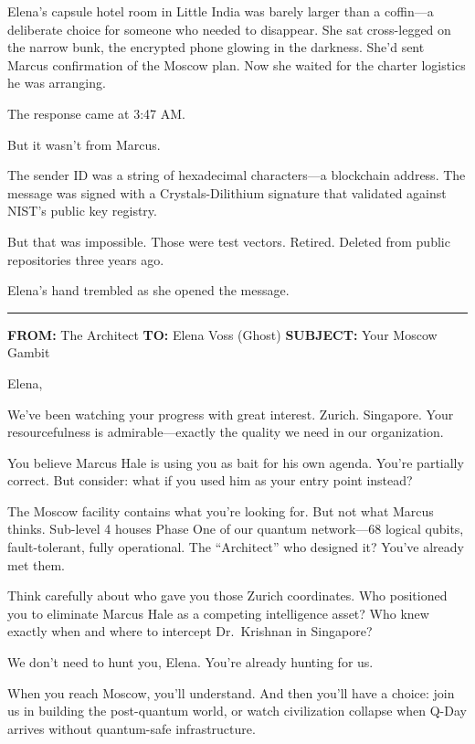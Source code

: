 Elena's capsule hotel room in Little India was barely larger than a
coffin---a deliberate choice for someone who needed to disappear. She
sat cross-legged on the narrow bunk, the encrypted phone glowing in the
darkness. She'd sent Marcus confirmation of the Moscow plan. Now she
waited for the charter logistics he was arranging.

The response came at 3:47 AM.

But it wasn't from Marcus.

The sender ID was a string of hexadecimal characters---a blockchain
address. The message was signed with a Crystals-Dilithium signature that
validated against NIST's public key registry.

But that was impossible. Those were test vectors. Retired. Deleted from
public repositories three years ago.

Elena's hand trembled as she opened the message.

\begin{center}\rule{0.5\linewidth}{0.5pt}\end{center}

\textbf{FROM:} The Architect \textbf{TO:} Elena Voss (Ghost)
\textbf{SUBJECT:} Your Moscow Gambit

Elena,

We've been watching your progress with great interest. Zurich.
Singapore. Your resourcefulness is admirable---exactly the quality we
need in our organization.

You believe Marcus Hale is using you as bait for his own agenda. You're
partially correct. But consider: what if you used him as your entry
point instead?

The Moscow facility contains what you're looking for. But not what
Marcus thinks. Sub-level 4 houses Phase One of our quantum network---68
logical qubits, fault-tolerant, fully operational. The ``Architect'' who
designed it? You've already met them.

Think carefully about who gave you those Zurich coordinates. Who
positioned you to eliminate Marcus Hale as a competing intelligence
asset? Who knew exactly when and where to intercept Dr.~Krishnan in
Singapore?

We don't need to hunt you, Elena. You're already hunting for us.

When you reach Moscow, you'll understand. And then you'll have a choice:
join us in building the post-quantum world, or watch civilization
collapse when Q-Day arrives without quantum-safe infrastructure.

